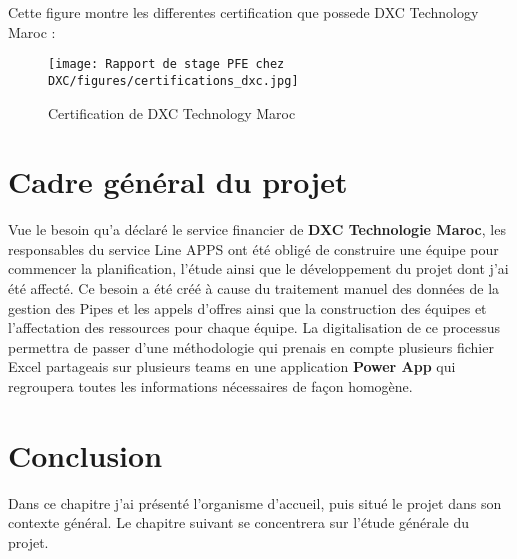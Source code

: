 Cette figure montre les differentes certification que possede DXC Technology Maroc : 

\begin{figure}[!h]
    \centering
    \texttt{[image: Rapport de stage PFE chez DXC/figures/certifications\_dxc.jpg]}
    \caption{Certification de DXC Technology Maroc}
\end{figure}

\section{Cadre général du projet }
Vue le besoin qu’a déclaré le service financier de \textbf{DXC Technologie Maroc}, les responsables du service Line APPS ont été obligé de construire une équipe pour commencer la planification, l’étude ainsi que le développement du projet dont j’ai été affecté. Ce besoin a été créé à cause du traitement manuel des données de la gestion des Pipes et les appels d’offres ainsi que la construction des équipes et l’affectation des ressources pour chaque équipe. La digitalisation de ce processus permettra de passer d'une méthodologie qui prenais en compte plusieurs fichier Excel partageais sur plusieurs teams en une application \textbf{Power App} qui regroupera toutes les informations nécessaires de façon homogène.


\section{Conclusion}
Dans ce chapitre j’ai présenté l’organisme d’accueil, puis situé le projet dans son contexte général. Le chapitre suivant se concentrera sur l’étude générale du projet.

